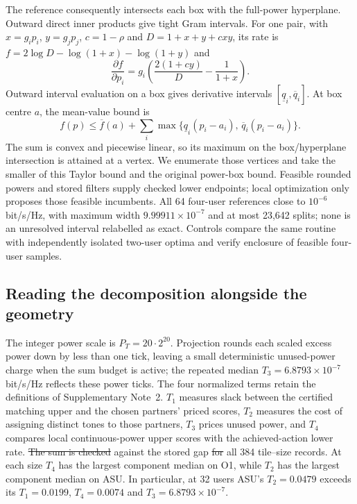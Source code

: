 \documentclass[10pt,letterpaper]{article}
\makeatletter
\providecommand{\DIFaddtex}[1]{{\protect\color{blue}\uwave{#1}}} %
\providecommand{\DIFdeltex}[1]{{\protect\color{red}\sout{#1}}} %
\providecommand{\DIFaddbegin}{} %
\providecommand{\DIFaddend}{} %
\providecommand{\DIFdelbegin}{} %
\providecommand{\DIFdelend}{} %
\providecommand{\DIFadd}[1]{\texorpdfstring{\DIFaddtex{#1}}{#1}} %
\providecommand{\DIFdel}[1]{\texorpdfstring{\DIFdeltex{#1}}{}} %
\let\sout@orig\sout %
\renewcommand{\sout}[1]{\ifmmode\text{\sout@orig{\ensuremath{#1}}}\else\sout@orig{#1}\fi} %
\makeatother
\begin{document}
The reference consequently intersects each box with the full-power hyperplane. Outward direct inner products give tight Gram intervals. For one pair, with \(x=g_i p_i\), \(y=g_j p_j\), \(c=1-\rho\) and \(D=1+x+y+cxy\), its rate is \(f=2\log D-\log(1+x)-\log(1+y)\) and
\[
\frac{\partial f}{\partial p_i}
=g_i\left(\frac{2(1+cy)}{D}-\frac{1}{1+x}\right).
\]
Outward interval evaluation on a box gives derivative intervals \([\underline q_i,\overline q_i]\). At box centre \(a\), the mean-value bound is
\[
f(p)\leq \overline f(a)+
\sum_i\max\{\underline q_i(p_i-a_i),\,\overline q_i(p_i-a_i)\}.
\]
The sum is convex and piecewise linear, so its maximum on the box/hyperplane intersection is attained at a vertex. We enumerate those vertices and take the smaller of this Taylor bound and the original power-box bound. Feasible rounded powers and stored filters supply checked lower endpoints; local optimization only proposes those feasible incumbents. All 64 four-user references close to \(10^{-6}\) bit/s/Hz, with maximum width \(9.99911\times10^{-7}\) and at most 23,642 splits; none is an unresolved interval relabelled as exact. Controls compare the same routine with independently isolated two-user optima and verify enclosure of feasible four-user samples.



\subsection*{Reading the decomposition alongside the geometry}
The integer power scale is \(P_T=20\cdot2^{20}\). Projection rounds each scaled excess power down by less than one tick, leaving a small deterministic unused-power charge when the sum budget is active; the repeated median \(T_3=6.8793\times10^{-7}\) bit/s/Hz reflects these power ticks. The four normalized terms retain the definitions of Supplementary Note~2. \(T_1\) measures slack between the certified matching upper and the chosen partners' priced scores, \(T_2\) measures the cost of assigning distinct tones to those partners, \(T_3\) prices unused power, and \(T_4\) compares local continuous-power upper scores with the achieved-action lower rate. \DIFdelbegin \DIFdel{The sum is checked }\DIFdelend \DIFaddbegin \DIFadd{We checked the sum }\DIFaddend against the stored gap \DIFdelbegin \DIFdel{for }\DIFdelend \DIFaddbegin \DIFadd{in }\DIFaddend all 384 tile--size records. At each size \(T_4\) has the largest component median on O1, while \(T_2\) has the largest component median on ASU. In particular, at 32 users ASU's \(T_2=0.0479\) exceeds its \(T_1=0.0199\), \(T_4=0.0074\) and \(T_3=6.8793\times10^{-7}\).
\end{document}
